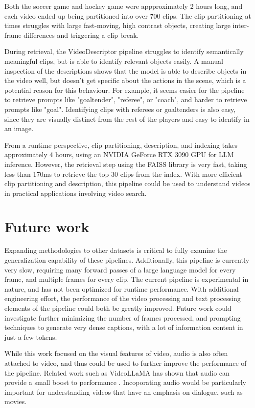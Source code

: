 \documentclass{article}
\begin{document}
Both the soccer game and hockey game were appproximately 2 hours long, and each video ended up being partitioned into over 700 clips.
The clip partitioning at times struggles with large fast-moving, high contrast objects, creating large inter-frame differences and triggering a clip break.

During retrieval, the VideoDescriptor pipeline struggles to identify semantically meaningful clips, but is able to identify relevant objects easily.
A manual inspection of the descriptions shows that the model is able to describe objects in the video well, but doesn't get specific about the actions in the scene, which is a potential reason for this behaviour.
For example, it seems easier for the pipeline to retrieve prompts like "goaltender", "referee", or "coach", and harder to retrieve prompts like "goal".
Identifying clips with referees or goaltenders is also easy, since they are visually distinct from the rest of the players and easy to identify in an image.

From a runtime perspective, clip partitioning, description, and indexing takes approximately 4 hours, using an NVIDIA GeForce RTX 3090 GPU for LLM inference.
However, the retrieval step using the FAISS library is very fast, taking less than 170ms to retrieve the top 30 clips from the index.
With more efficient clip partitioning and description, this pipeline could be used to understand videos in practical applications involving video search.




\section{Future work}

Expanding methodologies to other datasets is critical to fully examine the generalization capability of these pipelines.
Additionally, this pipeline is currently very slow, requiring many forward passes of a large language model for every frame, and multiple frames for every clip.
The current pipeline is experimental in nature, and has not been optimized for runtime performance.
With additional engineering effort, the performance of the video processing and text processing elements of the pipeline could both be greatly improved.
Future work could investigate further minimizing the number of frames processed, and prompting techniques to generate very dense captions, with a lot of information content in just a few tokens.

While this work focused on the visual features of video, audio is also often attached to video, and thus could be used to further improve the performance of the pipeline.
Related work such as VideoLLaMA has shown that audio can provide a small boost to performance \cite{videollama}.
Incoporating audio would be particularly important for understanding videos that have an emphasis on dialogue, such as movies.
\end{document}
